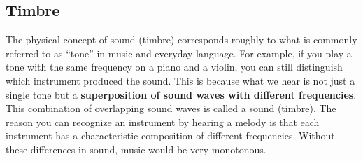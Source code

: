 \subsection{Timbre}
The physical concept of sound (timbre) corresponds roughly to what is commonly referred to as ``tone'' in music and everyday language. For example, if you play a tone with the same frequency on a piano and a violin, you can still distinguish which instrument produced the sound. This is because what we hear is not just a single tone but a \textbf{superposition of sound waves with different frequencies}. This combination of overlapping sound waves is called a sound (timbre). The reason you can recognize an instrument by hearing a melody is that each instrument has a characteristic composition of different frequencies. Without these differences in sound, music would be very monotonous.


